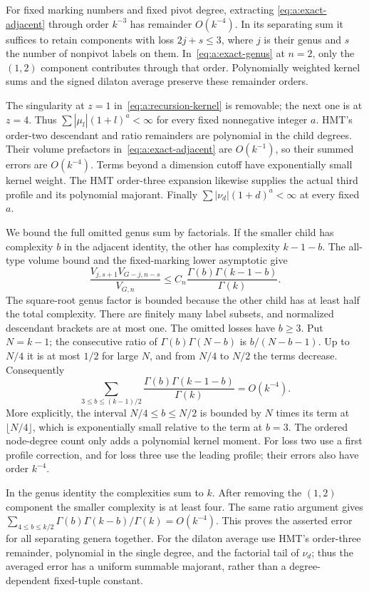 \begin{lmm}\label{lmm:a:extraction-tail}
For fixed marking numbers and fixed pivot degree, extracting
\eqref{eq:a:exact-adjacent} through order $k^{-3}$ has remainder
$O(k^{-4})$. In its separating sum it suffices to retain components
with loss $2j+s\leq3$, where $j$ is their genus and $s$ the number
of nonpivot labels on them. In~\eqref{eq:a:exact-genus} at $n=2$,
only the $(1,2)$ component contributes through that order.
Polynomially weighted kernel sums and the signed dilaton average
preserve these remainder orders.
\end{lmm}
\begin{prf}
The singularity at $z=1$ in~\eqref{eq:a:recursion-kernel} is removable;
the next one is at $z=4$. Thus $\sum|\mu_l|(1+l)^a<\infty$ for every
fixed nonnegative integer $a$. HMT's order-two descendant and ratio
remainders are polynomial in the child degrees. Their volume prefactors
in~\eqref{eq:a:exact-adjacent} are $O(k^{-1})$, so their summed errors
are $O(k^{-4})$. Terms beyond a dimension cutoff have exponentially
small kernel weight. The HMT order-three expansion likewise supplies
the actual third profile and its polynomial majorant. Finally
$\sum|\nu_d|(1+d)^a<\infty$ at every fixed $a$.

We bound the full omitted genus sum by factorials. If the smaller child
has complexity $b$ in the adjacent identity,
the other has complexity $k-1-b$. The all-type volume bound and the
fixed-marking lower asymptotic give
\[
 \frac{V_{j,s+1}V_{G-j,n-s}}{V_{G,n}}
 \leq C_n\frac{\Gamma(b)\Gamma(k-1-b)}{\Gamma(k)}.
\]
The square-root genus factor is bounded because the other child has
at least half the total complexity. There are finitely many label
subsets, and normalized descendant brackets are at most one.
The omitted losses have $b\geq3$. Put $N=k-1$; the consecutive ratio
of $\Gamma(b)\Gamma(N-b)$ is $b/(N-b-1)$. Up to $N/4$ it is at
most $1/2$ for large $N$, and from $N/4$ to $N/2$ the terms decrease.
Consequently
\[
 \sum_{3\leq b\leq(k-1)/2}
 \frac{\Gamma(b)\Gamma(k-1-b)}{\Gamma(k)}=O(k^{-4}).
\]
More explicitly, the interval $N/4\leq b\leq N/2$ is bounded by
$N$ times its term at $\lfloor N/4\rfloor$, which is exponentially
small relative to the term at $b=3$. The ordered node-degree count
only adds a polynomial kernel moment.
For loss two use a first profile correction, and for loss three use
the leading profile; their errors also have order $k^{-4}$.

In the genus identity the complexities sum to $k$. After removing
the $(1,2)$ component the smaller complexity is at least four.
The same ratio argument gives
$\sum_{4\leq b\leq k/2}\Gamma(b)\Gamma(k-b)/\Gamma(k)=O(k^{-4})$.
This proves the asserted error for all separating genera together.
For the dilaton average use HMT's order-three remainder, polynomial
in the single degree, and the factorial tail of $\nu_d$; thus the
averaged error has a uniform summable majorant, rather than a
degree-dependent fixed-tuple constant.
\end{prf}

